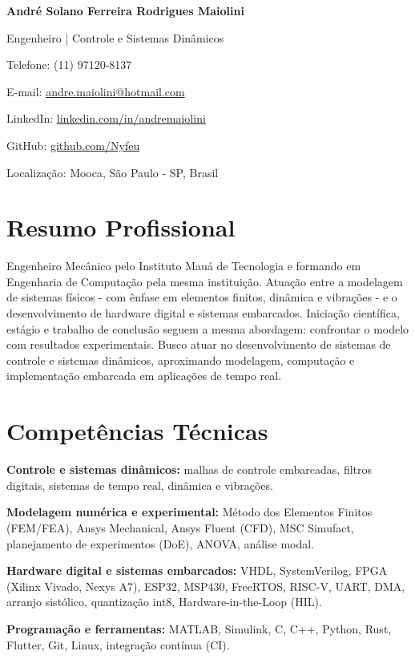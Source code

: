 \documentclass[10pt,a4paper]{article}
\begin{document}
{\LARGE\bfseries André Solano Ferreira Rodrigues Maiolini}\par
\vspace{3pt}
{\large Engenheiro | Controle e Sistemas Dinâmicos}\par
\vspace{7pt}

Telefone: (11) 97120-8137\par
E-mail: \href{mailto:andre.maiolini@hotmail.com}{andre.maiolini@hotmail.com}\par
LinkedIn: \href{https://linkedin.com/in/andremaiolini}{linkedin.com/in/andremaiolini}\par
GitHub: \href{https://github.com/Nyfeu}{github.com/Nyfeu}\par
Localização: Mooca, São Paulo - SP, Brasil\par

\section{Resumo Profissional}

Engenheiro Mecânico pelo Instituto Mauá de Tecnologia e formando em Engenharia
de Computação pela mesma instituição. Atuação entre a modelagem de sistemas
físicos - com ênfase em elementos finitos, dinâmica e vibrações - e o
desenvolvimento de hardware digital e sistemas embarcados. Iniciação
científica, estágio e trabalho de conclusão seguem a mesma abordagem:
confrontar o modelo com resultados experimentais. Busco atuar no
desenvolvimento de sistemas de controle e sistemas dinâmicos, aproximando
modelagem, computação e implementação embarcada em aplicações de tempo real.

\section{Competências Técnicas}

\textbf{Controle e sistemas dinâmicos:} malhas de controle embarcadas, filtros
digitais, sistemas de tempo real, dinâmica e vibrações.\par
\vspace{3pt}
\textbf{Modelagem numérica e experimental:} Método dos Elementos Finitos
(FEM/FEA), Ansys Mechanical, Ansys Fluent (CFD), MSC Simufact, planejamento de
experimentos (DoE), ANOVA, análise modal.\par
\vspace{3pt}
\textbf{Hardware digital e sistemas embarcados:} VHDL, SystemVerilog, FPGA
(Xilinx Vivado, Nexys A7), ESP32, MSP430, FreeRTOS, RISC-V, UART, DMA,
arranjo sistólico, quantização int8, Hardware-in-the-Loop (HIL).\par
\vspace{3pt}
\textbf{Programação e ferramentas:} MATLAB, Simulink, C, C++, Python, Rust, Flutter, Git,
Linux, integração contínua (CI).\par
\end{document}
